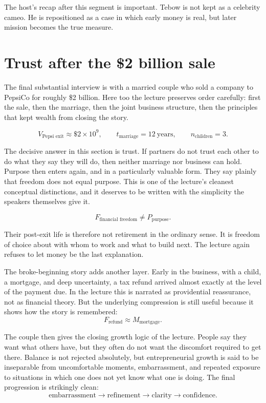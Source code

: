 The host's recap after this segment is important. Tebow is not kept as a celebrity cameo. He is repositioned as a case in which early money is real, but later mission becomes the true measure.

\section{Trust after the \$2 billion sale}

The final substantial interview is with a married couple who sold a company to PepsiCo for roughly \$2 billion. Here too the lecture preserves order carefully: first the sale, then the marriage, then the joint business structure, then the principles that kept wealth from closing the story.

\begin{equation}
V_{\text{Pepsi exit}} \approx \$2\times 10^9, \qquad
t_{\text{marriage}} = 12\ \text{years}, \qquad
n_{\text{children}} = 3.
\end{equation}

The decisive answer in this section is trust. If partners do not trust each other to do what they say they will do, then neither marriage nor business can hold. Purpose then enters again, and in a particularly valuable form. They say plainly that freedom does not equal purpose. This is one of the lecture's cleanest conceptual distinctions, and it deserves to be written with the simplicity the speakers themselves give it.

\begin{equation}
F_{\text{financial freedom}} \neq P_{\text{purpose}}.
\end{equation}

Their post-exit life is therefore not retirement in the ordinary sense. It is freedom of choice about with whom to work and what to build next. The lecture again refuses to let money be the last explanation.

The broke-beginning story adds another layer. Early in the business, with a child, a mortgage, and deep uncertainty, a tax refund arrived almost exactly at the level of the payment due. In the lecture this is narrated as providential reassurance, not as financial theory. But the underlying compression is still useful because it shows how the story is remembered:
\begin{equation}
F_{\text{refund}} \approx M_{\text{mortgage}}.
\end{equation}

The couple then gives the closing growth logic of the lecture. People say they want what others have, but they often do not want the discomfort required to get there. Balance is not rejected absolutely, but entrepreneurial growth is said to be inseparable from uncomfortable moments, embarrassment, and repeated exposure to situations in which one does not yet know what one is doing. The final progression is strikingly clean:
\begin{equation}
\text{embarrassment} \longrightarrow \text{refinement} \longrightarrow \text{clarity} \longrightarrow \text{confidence}.
\end{equation}

